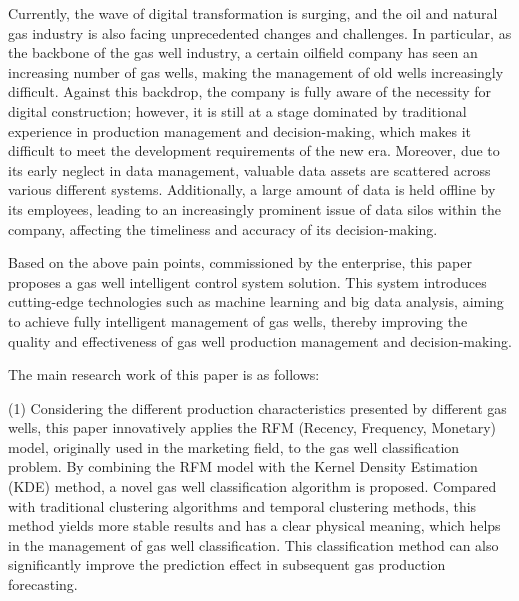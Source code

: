 \begin{englishabstract}
    Currently, the wave of digital transformation is surging, and the oil and natural gas industry is also facing unprecedented changes and challenges. In particular, as the backbone of the gas well industry, a certain oilfield company has seen an increasing number of gas wells, making the management of old wells increasingly difficult. Against this backdrop, the company is fully aware of the necessity for digital construction; however, it is still at a stage dominated by traditional experience in production management and decision-making, which makes it difficult to meet the development requirements of the new era. Moreover, due to its early neglect in data management, valuable data assets are scattered across various different systems. Additionally, a large amount of data is held offline by its employees, leading to an increasingly prominent issue of data silos within the company, affecting the timeliness and accuracy of its decision-making.

    Based on the above pain points, commissioned by the enterprise, this paper proposes a gas well intelligent control system solution. This system introduces cutting-edge technologies such as machine learning and big data analysis, aiming to achieve fully intelligent management of gas wells, thereby improving the quality and effectiveness of gas well production management and decision-making.
    
    The main research work of this paper is as follows:
    
    (1) Considering the different production characteristics presented by different gas wells, this paper innovatively applies the RFM (Recency, Frequency, Monetary) model, originally used in the marketing field, to the gas well classification problem. By combining the RFM model with the Kernel Density Estimation (KDE) method, a novel gas well classification algorithm is proposed. Compared with traditional clustering algorithms and temporal clustering methods, this method yields more stable results and has a clear physical meaning, which helps in the management of gas well classification. This classification method can also significantly improve the prediction effect in subsequent gas production forecasting.
    

\end{englishabstract}
